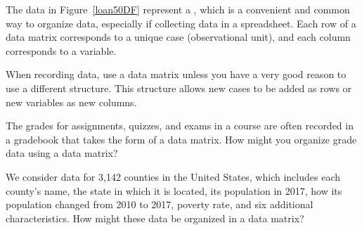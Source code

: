 
The data in Figure~\ref{loan50DF} represent a ,
which is a convenient and common way to organize data,
especially if collecting data in a spreadsheet.
Each row of a data matrix corresponds to a unique case
(observational unit),
and each column corresponds to a variable.

When recording data, use a data matrix unless you have
a very good reason to use a different structure.
This structure allows new cases to be added as rows
or new variables as new columns.

\begin{exercisewrap}
\begin{nexercise}
The grades for assignments, quizzes, and exams in a course are
often recorded in a gradebook that takes the form of a data matrix.
How might you organize grade data using a data
matrix?\footnotemark
\end{nexercise}
\end{exercisewrap}


\begin{exercisewrap}
\begin{nexercise}\label{desc_county_as_data_matrix}%
We consider data for 3,142 counties in the United States,
which includes each county's name,
the state in which it is located, its population in 2017,
how its population changed from 2010 to 2017,
poverty rate,
and six additional characteristics.
How might these data be organized in
a data matrix?\footnotemark
\end{nexercise}
\end{exercisewrap}
\addtocounter{footnote}{-1}
\addtocounter{footnote}{1}

